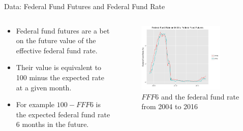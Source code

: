 \documentclass[9pt]{beamer}
\begin{document}
	\begin{frame}{Data: Federal Fund Futures and Federal Fund Rate}
	
		\begin{columns}
			\begin{column}{0.5\textwidth}
				\begin{itemize}
					\item Federal fund futures are a bet on the future value of the effective federal fund rate.
					\item Their value is equivalent to 100 minus the expected rate at a given month.
					\item For example $100-FFF6$ is the expected federal fund rate 6 months in the future.
				\end{itemize}
			\end{column}
			\begin{column}{0.5\textwidth}
				\begin{figure}
					\includegraphics[width=0.8\textwidth]{ffrfff6.png}
					\caption{$FFF6$ and the federal fund rate from 2004 to 2016}
				\end{figure}
			\end{column}
		\end{columns}
	
	
	\end{frame}
	
\end{document}
